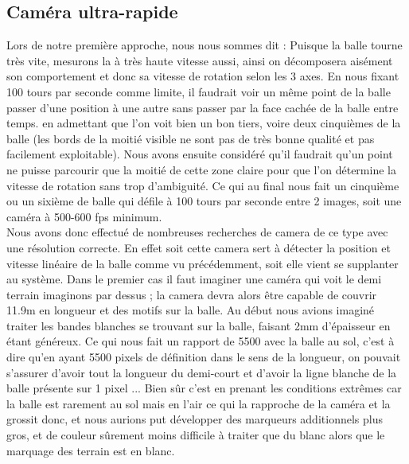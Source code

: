 \subsection{Caméra ultra-rapide}

Lors de notre première approche, nous nous sommes dit : Puisque la balle tourne très vite, mesurons la à très haute vitesse aussi, ainsi on décomposera aisément son comportement et donc sa vitesse de rotation selon les 3 axes. En nous fixant 100 tours par seconde comme limite, il faudrait voir un même point de la balle passer d'une position à une autre sans passer par la face cachée de la balle entre temps. en admettant que l'on voit bien un bon tiers, voire deux cinquièmes de la balle (les bords de la moitié visible ne sont pas de très bonne qualité et pas facilement exploitable). Nous avons ensuite considéré qu'il faudrait qu'un point ne puisse parcourir que la moitié de cette zone claire pour que l'on détermine la vitesse de rotation sans trop d'ambiguité. Ce qui au final nous fait un cinquième ou un sixième de balle qui défile à 100 tours par seconde entre 2 images, soit une caméra à 500-600 fps minimum.\\

Nous avons donc effectué de nombreuses recherches de camera de ce type avec une résolution correcte. En effet soit cette camera sert à détecter la position et vitesse linéaire de la balle comme vu précédemment, soit elle vient se supplanter au système. Dans le premier cas il faut imaginer une caméra qui voit le demi terrain imaginons par dessus ; la camera devra alors être capable de couvrir 11.9m en longueur et des motifs sur la balle. Au début nous avions imaginé traiter les bandes blanches se trouvant sur la balle, faisant 2mm d'épaisseur en étant généreux. Ce qui nous fait un rapport de 5500 avec la balle au sol, c'est à dire qu'en ayant 5500 pixels de définition dans le sens de la longueur, on pouvait s'assurer d'avoir tout la longueur du demi-court et d'avoir la ligne blanche de la balle présente sur 1 pixel ... Bien sûr c'est en prenant les conditions extrêmes car la balle est rarement au sol mais en l'air ce qui la rapproche de la caméra et la grossit donc, et nous aurions put développer des marqueurs additionnels plus gros, et de couleur sûrement moins difficile à traiter que du blanc alors que le marquage des terrain est en blanc.\\

